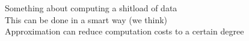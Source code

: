 Something about computing a shitload of data\\
This can be done in a smart way (we think)\\
Approximation can reduce computation costs to a certain degree
